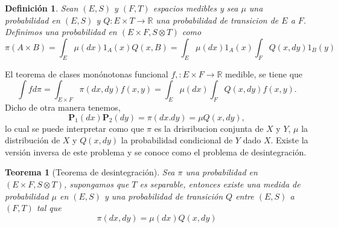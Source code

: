 \documentclass[letterpaper]{article}
\newtheorem{teorema}{Teorema}[section]
\newtheorem{def.}{Definici\'on}[section]
\newcommand{\prob}{\textbf{P}}
\newcommand{\re}{\ensuremath{\mathbb R }}
\begin{document}
\begin{def.}
  Sean \((E,S)\) y \((F,T)\) espacios medibles y sea \(\mu\) una probabilidad en \((E,S)\) y \(Q:E\times T\rightarrow\re\) una probabilidad de transicion de \(E\) a \(F\). Definimos una probabilidad en \((E\times F,S \otimes T)\) como
  \[
    \pi(A\times B)=\int_{E}\mu(dx)1_A(x)Q(x,B)=\int_{E}\mu(dx)1_A(x)\int_{F}Q(x,dy)1_B(y)
  \]
  \end{def.}
El teorema de clases monónotonas funcional \(f,:E\times F\rightarrow\re\) medible, se tiene que
\[
\int f d\pi=\int_{E\times F}\pi(dx,dy)f(x,y)=\int_{E}\mu(dx)\int_{F}Q(x,dy)f(x,y).
\]
Dicho de otra manera tenemos,
\[
    \prob_1(dx)\prob_2(dy)=\pi(dx.dy)=\mu Q(x,dy),
\]
\noindent lo cual se puede interpretar como que \(\pi\) es la drisribucion conjunta de \(X\) y \(Y\), \(\mu\) la distribución de \(X\) y \(Q(x,dy)\) la probabilidad condicional de \(Y\) dado \(X\). Existe la versión inversa de este problema y se conoce como el problema de desintegración.
\begin{teorema}[Teorema de desintegración]
Sea $\pi$ una probabilidad en $(E\times F,S \otimes T)$, supongamos que $T$ es separable, entonces existe una medida de probabilidad $\mu$ en $(E,S)$ y una probabilidad de transición $Q$ entre $(E,S)$ a $(F,T)$ tal que
\[
    \pi(dx,dy)=\mu(dx)Q(x,dy)
\]
\end{teorema}
\end{document}
